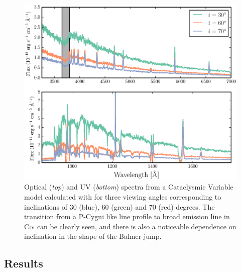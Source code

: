 \documentclass[useAMS,usenatbib,onecolumn]{mn2e2}
\begin{document}
\begin{figure}[h]
\centering
\includegraphics[width=1.0\textwidth]{figures/plot_combined1.eps}
\caption{Optical ({\sl top}) and UV ({\sl bottom}) spectra from a Cataclysmic Variable model 
calculated with \py for three viewing angles corresponding 
to inclinations of 30 (blue), 60 (green) and 70 (red) degrees.
The transition from a P-Cygni like line profile to broad emission line in C\textsc{iv}  can be clearly seen, and there is also a noticeable dependence on inclination in the shape of the Balmer jump.}
\label{spec}
\end{figure}



\subsection{Results}
\end{document}
